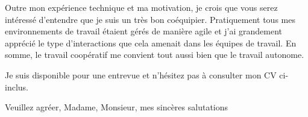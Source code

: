  
Outre mon expérience technique et ma motivation, je crois que vous serez intéressé d'entendre que je suis un très bon coéquipier. Pratiquement tous mes environnements de travail étaient gérés de manière agile et j'ai grandement apprécié le type d'interactions que cela amenait dans les équipes de travail. En somme, le travail coopératif me convient tout aussi bien que le travail autonome.

Je suis disponible pour une entrevue et n’hésitez pas à consulter mon CV ci-inclus.

Veuillez agréer, Madame, Monsieur, mes sincères salutations


